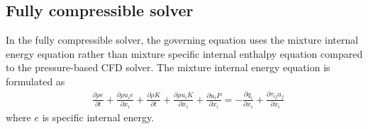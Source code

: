 



\subsection{Fully compressible solver}
In the fully compressible solver, the governing equation uses the mixture internal energy equation rather than mixture specific internal enthalpy equation compared to the pressure-based CFD solver. The mixture internal energy equation is formulated as
\begin{align}
	 & \frac{\partial \rho e}{\partial t}+\frac{\partial \rho u_i e}{\partial x_i}+\frac{\partial \rho K}{\partial t}+\frac{\partial \rho u_i K}{\partial x_i}+\frac{\partial  u_i P}{\partial x_i}=-\frac{\partial q_i}{\partial x_i} +\frac{\partial \tau_{ij}u_j}{\partial x_i}
\end{align}
where $e$ is specific internal energy.


